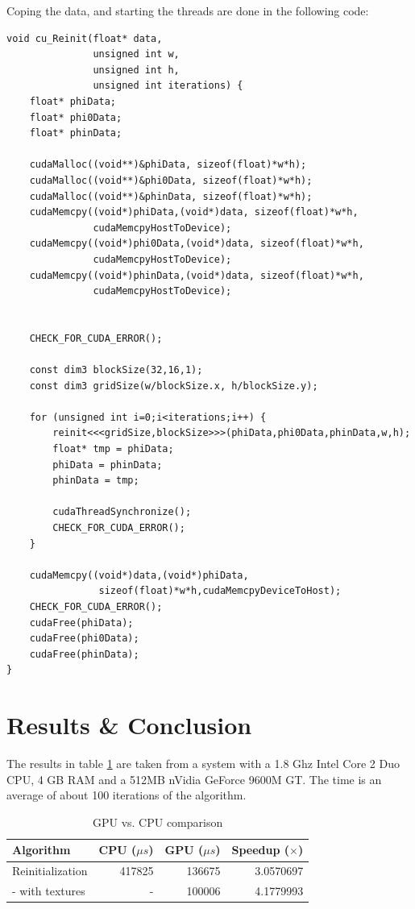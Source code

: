 Coping the data, and starting the threads are done in the following code:

\begin{lstlisting}
void cu_Reinit(float* data, 
               unsigned int w,
               unsigned int h,
               unsigned int iterations) {
    float* phiData;
    float* phi0Data;
    float* phinData;

    cudaMalloc((void**)&phiData, sizeof(float)*w*h);
    cudaMalloc((void**)&phi0Data, sizeof(float)*w*h);
    cudaMalloc((void**)&phinData, sizeof(float)*w*h);
    cudaMemcpy((void*)phiData,(void*)data, sizeof(float)*w*h,
               cudaMemcpyHostToDevice);
    cudaMemcpy((void*)phi0Data,(void*)data, sizeof(float)*w*h,
               cudaMemcpyHostToDevice);
    cudaMemcpy((void*)phinData,(void*)data, sizeof(float)*w*h,
               cudaMemcpyHostToDevice);


    CHECK_FOR_CUDA_ERROR();

    const dim3 blockSize(32,16,1);
    const dim3 gridSize(w/blockSize.x, h/blockSize.y);

    for (unsigned int i=0;i<iterations;i++) {
        reinit<<<gridSize,blockSize>>>(phiData,phi0Data,phinData,w,h);
        float* tmp = phiData;
        phiData = phinData;
        phinData = tmp;

        cudaThreadSynchronize();
        CHECK_FOR_CUDA_ERROR();
    }

    cudaMemcpy((void*)data,(void*)phiData,
                sizeof(float)*w*h,cudaMemcpyDeviceToHost);
    CHECK_FOR_CUDA_ERROR();
    cudaFree(phiData);
    cudaFree(phi0Data);
    cudaFree(phinData);
}

\end{lstlisting}

\section{Results \& Conclusion}

The results in table \ref{tbl:cudaRes} are taken from a system with a
1.8 Ghz Intel Core 2 Duo CPU, 4 GB RAM and a 512MB nVidia GeForce
9600M GT. The time is an average of about 100 iterations of the
algorithm.

\begin{table}[h]
  \centering
  \begin{tabular}{|l|r|r|r|}
    \hline    Algorithm & CPU ($\mu s$) & GPU ($\mu s$) & Speedup ($\times$) \\
\hline
Reinitialization & 417825 & 136675 & 3.0570697 \\
- with textures & - & 100006 & 4.1779993 \\
\hline
  \end{tabular}
  \caption{GPU vs. CPU comparison}
  \label{tbl:cudaRes}
\end{table}

